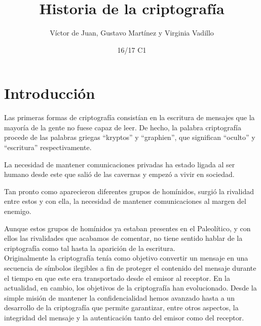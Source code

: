\documentclass[nochap]{apuntesURJC}
\title{Historia de la criptografía}
\author{Víctor de Juan, Gustavo Martínez y Virginia Vadillo}
\date{16/17 C1}
\begin{document}
\maketitle %

\setcounter{tocdepth}{3} %

\tableofcontents %
\newpage






\section{Introducción}
Las primeras formas de criptografía consistían en la escritura de mensajes que la mayoría de la gente no fuese capaz de leer. De hecho, la palabra criptografía procede de las palabras griegas ``kryptos'' y ``graphien'', que significan ``oculto'' y ``escritura'' respectivamente.

La necesidad de mantener comunicaciones privadas ha estado ligada al ser humano desde este que salió de las cavernas y empezó a vivir en sociedad.

Tan pronto como aparecieron diferentes grupos de homínidos, surgió la rivalidad entre estos y con ella, la necesidad de mantener comunicaciones al margen del enemigo.

Aunque estos grupos de homínidos ya estaban presentes en el Paleolítico, y con ellos las rivalidades que acabamos de comentar, no tiene sentido hablar de la criptografía como tal hasta la aparición de la escritura.\\


Originalmente la criptografía tenía como objetivo convertir un mensaje en una secuencia de símbolos ilegibles a fin de proteger el contenido del mensaje durante el tiempo en que este era transportado desde el emisor al receptor. En la actualidad, en cambio, los objetivos de la criptografía han evolucionado. Desde la simple misión de mantener la confidencialidad hemos avanzado hasta a un desarrollo de la criptografía que permite garantizar, entre otros aspectos, la integridad del mensaje y la autenticación tanto del emisor como del receptor.
\end{document}
